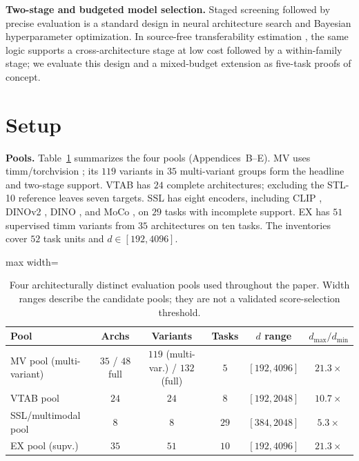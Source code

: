 \documentclass{article}
\begin{document}
\textbf{Two-stage and budgeted model selection.}  Staged screening followed by precise evaluation is a standard design in neural architecture search and Bayesian hyperparameter optimization.  In source-free transferability estimation \citep{zhang2021logme,wang2023ncti}, the same logic supports a cross-architecture stage at low cost followed by a within-family stage; we evaluate this design and a mixed-budget extension as five-task proofs of concept.

\section{Setup}
\label{sec:setup}

\textbf{Pools.} Table~\ref{tab:pool_setup} summarizes the four pools (Appendices~B--E). MV uses timm/torchvision \citep{wightman2019timm}; its $119$ variants in $35$ multi-variant groups form the headline and two-stage support. VTAB \citep{zhai2019large} has $24$ complete architectures; excluding the STL-10 reference leaves seven targets. SSL has eight encoders, including CLIP \citep{radford2021clip}, DINOv2 \citep{oquab2023dinov2}, DINO \citep{caron2021dino}, and MoCo \citep{he2020moco}, on $29$ tasks with incomplete support. EX has $51$ supervised timm variants from $35$ architectures on ten tasks. The inventories cover $52$ task units and $d\in[192,4096]$.

\begin{table}[h]
\centering\small
\caption{Four architecturally distinct evaluation pools used throughout the paper.  Width ranges describe the candidate pools; they are not a validated score-selection threshold.}
\label{tab:pool_setup}
\begin{adjustbox}{max width=\linewidth}
\begin{tabular}{lccccc}
\toprule
Pool & Archs & Variants & Tasks & $d$ range & $d_{\max}/d_{\min}$ \\
\midrule
MV pool (multi-variant)  & $35$ / $48$ full & $119$ (multi-var.) / $132$ (full) & $5$  & $[192, 4096]$ & $21.3\times$ \\
VTAB pool                & $24$ & $24$                               & $8$  & $[192, 2048]$ & $10.7\times$ \\
SSL/multimodal pool      & $8$  & $8$                                & $29$ & $[384, 2048]$ & $5.3\times$  \\
EX pool (supv.)          & $35$ & $51$                               & $10$ & $[192, 4096]$ & $21.3\times$ \\
\bottomrule
\end{tabular}
\end{adjustbox}
\end{table}
\end{document}
